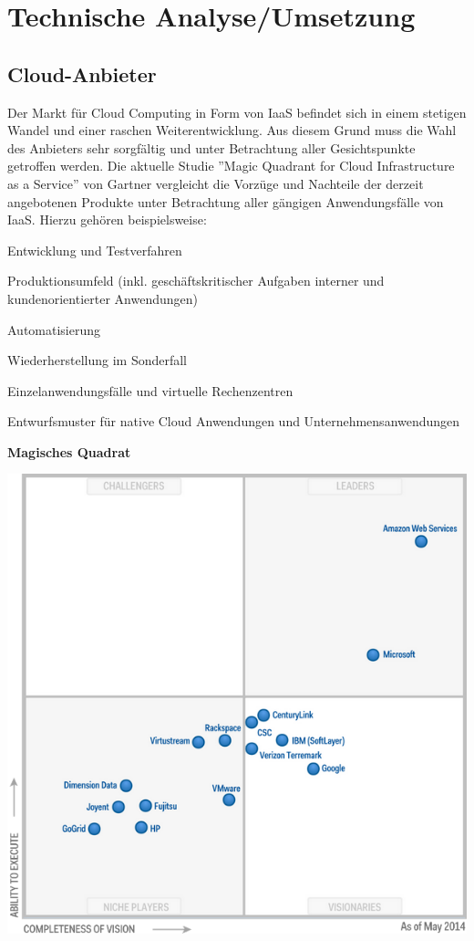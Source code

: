 \documentclass[13pt,a4paper,bibliography=totocnumbered,listof=totocnumbered]{scrartcl}
\begin{document}
\section{Technische Analyse/Umsetzung}\label{UmsetzungV}

\subsection{Cloud-Anbieter}
Der Markt für Cloud Computing in Form von IaaS befindet sich in einem stetigen Wandel und einer raschen Weiterentwicklung. Aus diesem Grund muss die Wahl des Anbieters sehr sorgfältig und unter Betrachtung aller Gesichtspunkte getroffen werden. Die aktuelle Studie ''Magic Quadrant for Cloud Infrastructure as a Service'' von Gartner \cite{30} vergleicht die Vorzüge und Nachteile der derzeit angebotenen Produkte unter Betrachtung aller gängigen Anwendungsfälle von IaaS. Hierzu gehören beispielsweise:
\begin{compactitem}
	\item Entwicklung und Testverfahren
	\item Produktionsumfeld (inkl. geschäftskritischer Aufgaben interner und kundenorientierter Anwendungen)
	\item Automatisierung
	\item Wiederherstellung im Sonderfall
	\item Einzelanwendungsfälle und virtuelle Rechenzentren
	\item Entwurfsmuster für native Cloud Anwendungen und Unternehmensanwendungen
\end{compactitem}
\pagebreak

\textbf{Magisches Quadrat}
\vspace{1em}
$\;$\\
\begin{minipage}{\linewidth}
	\centering
	\includegraphics[width=0.7\linewidth]{./img/Gartner_Magic_Square.png}
	\label{Gartner}
\end{minipage}
\vspace{1em}
\end{document}
